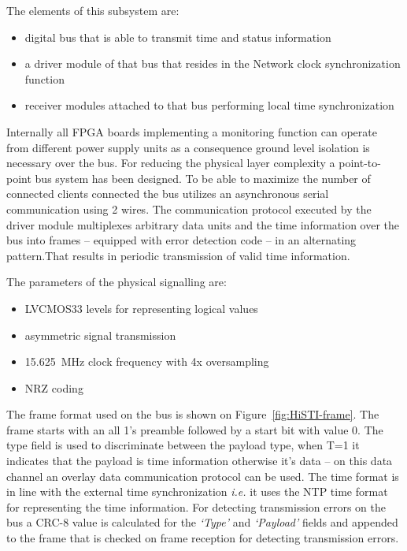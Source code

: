 \documentclass[article]{IEEEtran}
\begin{document}
The elements of this subsystem are:
\begin{itemize}
    \item digital bus that is able to transmit time and status information
    \item a driver module of that bus that resides in the Network clock synchronization function
    \item receiver modules attached to that bus performing local time synchronization
\end{itemize}

Internally all FPGA boards implementing a monitoring function can operate from different power supply units as a consequence ground level
isolation is necessary over the bus. For reducing the physical layer complexity
a point-to-point bus system has been designed. To be able to maximize the number of connected clients connected the
bus utilizes an asynchronous serial communication using 2 wires. The communication protocol executed by the driver module
multiplexes arbitrary data units and the time information over the bus into frames -- equipped with error detection code --
in an alternating pattern.That results in periodic transmission of valid time information.

The parameters of the physical signalling are:
\begin{itemize}
    \item LVCMOS33 levels for representing logical values
    \item asymmetric signal transmission
    \item \SI{15.625}{\mega\hertz} clock frequency with 4x oversampling
    \item NRZ coding
\end{itemize}

The frame format used on the bus is shown on Figure~\ref{fig:HiSTI-frame}. The frame starts with an all 1's preamble 
followed by a start bit with value 0. The type field is used to discriminate between the payload type, when T=1 it indicates that the payload is 
time information otherwise it's data -- on this data channel an overlay data communication protocol can be used.
The time format is in line with the external time synchronization \emph{i.e.} it uses the NTP
time format for representing the time information. For detecting transmission errors on the bus a CRC-8 value is calculated 
for the \emph{`Type'} and \emph{`Payload'} fields and appended to the frame that is checked on frame reception for detecting
transmission errors.
\end{document}
